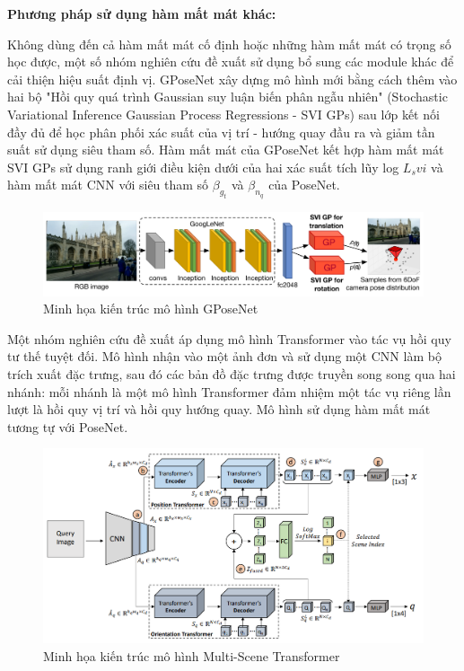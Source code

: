\noindent\textbf{Phương pháp sử dụng hàm mất mát khác:}

Không dùng đến cả hàm mất mát cố định hoặc những hàm mất mát có trọng số học được, một số nhóm nghiên cứu đề xuất sử dụng bổ sung các module khác để cải thiện hiệu suất định vị. GPoseNet \cite{Cai2018AHP} xây dựng mô hình mới bằng cách thêm vào hai bộ "Hồi quy quá trình Gaussian suy luận biến phân ngẫu nhiên" (Stochastic Variational Inference Gaussian Process Regressions - SVI GPs) sau lớp kết nối đầy đủ để học phân phối xác suất của vị trí - hướng quay đầu ra và giảm tần suất sử dụng siêu tham số. Hàm mất mát của GPoseNet kết hợp hàm mất mát SVI GPs sử dụng ranh giới điều kiện dưới của hai xác suất tích lũy log $L_{s}vi$ và hàm mất mát CNN với siêu tham số $\beta_{g_{t}}$ và $\beta_{n_{q}}$ của PoseNet.
\begin{figure}[H]
    \centering
    \includegraphics[width=\textwidth]{pics/Chapter2/gposenet.png}
    \caption{Minh họa kiến trúc mô hình GPoseNet \cite{kendall2017geometric}}
\end{figure}

Một nhóm nghiên cứu \cite{shavit2021learning, shavit2023coarse} đề xuất áp dụng mô hình Transformer vào tác vụ hồi quy tư thế tuyệt đối. Mô hình nhận vào một ảnh đơn và sử dụng một CNN làm bộ trích xuất đặc trưng, sau đó các bản đồ đặc trưng được truyền song song qua hai nhánh: mỗi nhánh là một mô hình Transformer đảm nhiệm một tác vụ riêng lần lượt là hồi quy vị trí và hồi quy hướng quay. Mô hình sử dụng hàm mất mát tương tự với PoseNet.
\begin{figure}[H]
    \centering
    \includegraphics[width=\textwidth]{pics/Chapter2/trans.png}
    \caption{Minh họa kiến trúc mô hình Multi-Scene Transformer \cite{shavit2021learning, shavit2023coarse}}
\end{figure}

